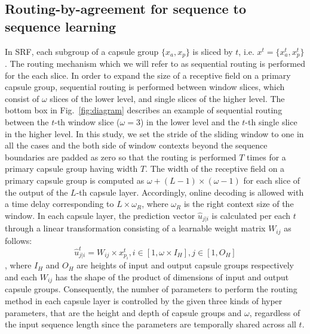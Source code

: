 \documentclass[review]{elsarticle}
\begin{document}
\subsection{Routing-by-agreement for sequence to sequence learning}
In SRF, each subgroup of a capsule group $\{x_a, x_p\}$ is sliced by $t$, i.e. $x^t=\{x_a^t, x_p^t\}$. The routing mechanism which we will refer to as sequential routing is performed for the each slice.
In order to expand the size of a receptive field on a primary capsule group, sequential routing is performed between window slices, which consist of $\omega$ slices of the lower level, and single slices of the higher level.
The bottom box in Fig.~\ref{fig:diagram} describes an example of sequential routing between the $t$-th window slice ($\omega = 3$) in the lower level and the $t$-th single slice in the higher level.
In this study, we set the stride of the sliding window to one in all the cases and the both side of window contexts beyond the sequence boundaries are padded as zero so that the routing is performed $T$ times for a primary capsule group having width $T$.
The width of the receptive field on a primary capsule group is computed as $\omega + (L-1) \times (\omega - 1)$ for each slice of the output of the \(L\)-th capsule layer.
Accordingly, online decoding is allowed with a time delay corresponding to \(L \times \omega_R\), where \(\omega_R\) is the right context size of the window.
In each capsule layer, the prediction vector \(\hat{u}_{j|i}\) is calculated per each \(t\) through a linear transformation consisting of a learnable weight matrix \(W_{ij}\) as follows:
\begin{equation}
\hat{u}_{j|i}^t = W_{ij} \times x_{p_i}^t, i \in [1, \omega \times I_H], j \in [1, O_H]
\label{eq:uhat}
\end{equation}
, where $I_H$ and $O_H$ are heights of input and output capsule groups respectively and each $W_{ij}$ has the shape of the product of dimensions of input and output capsule groups.
Consequently, the number of parameters to perform the routing method in each capsule layer is controlled by the given three kinds of hyper parameters, that are the height and depth of capsule groups and $\omega$, regardless of the input sequence length since the parameters are temporally shared across all $t$.
\end{document}
